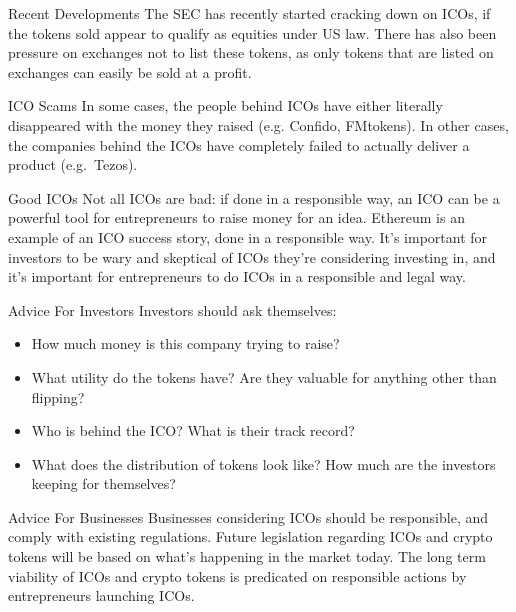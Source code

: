 \documentclass[14pt]{beamer}
\begin{document}
\begin{frame}{Recent Developments}
  The SEC has recently started cracking down on ICOs, if the tokens sold appear
  to qualify as equities under US law.
  \newline
  \newline
  There has also been pressure on exchanges not to list these tokens, as only
  tokens that are listed on exchanges can easily be sold at a profit.
\end{frame}

\begin{frame}{ICO Scams}
  In some cases, the people behind ICOs have either literally disappeared with
  the money they raised (e.g. Confido, FMtokens).
  \newline
  \newline
  In other cases, the companies behind the ICOs have completely failed to
  actually deliver a product (e.g.~Tezos).
\end{frame}

\begin{frame}{Good ICOs}
  Not all ICOs are bad: if done in a responsible way, an ICO can be a powerful
  tool for entrepreneurs to raise money for an idea. Ethereum is an example of
  an ICO success story, done in a responsible way.
  \newline
  \newline
  It's important for investors to be wary and skeptical of ICOs they're
  considering investing in, and it's important for entrepreneurs to do ICOs in a
  responsible and legal way.
\end{frame}

\begin{frame}{Advice For Investors}
  Investors should ask themselves:
  \begin{itemize}
  \item How much money is this company trying to raise?
    \item What utility do the tokens have? Are they valuable for anything other
      than flipping?
    \item Who is behind the ICO? What is their track record?
    \item What does the distribution of tokens look like? How much are the
      investors keeping for themselves?
  \end{itemize}
\end{frame}

\begin{frame}{Advice For Businesses}
  Businesses considering ICOs should be responsible, and comply with existing
  regulations.
  \newline
  \newline
  Future legislation regarding ICOs and crypto tokens will be based on what's
  happening in the market today.
  \newline
  \newline
  The long term viability of ICOs and crypto
  tokens is predicated on responsible actions by entrepreneurs launching ICOs.
\end{frame}
\end{document}
